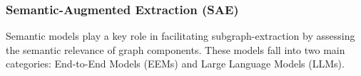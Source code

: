 {%

\vspace{-5pt}
\subsubsection{{\bf Semantic-Augmented Extraction ({\bf SAE})}}
\label{subsec:sae}
Semantic models play a key role in facilitating subgraph-extraction by assessing the semantic relevance of graph components.
These models fall into two main categories: %
End-to-End Models (EEMs) and Large Language Models (LLMs).


}
